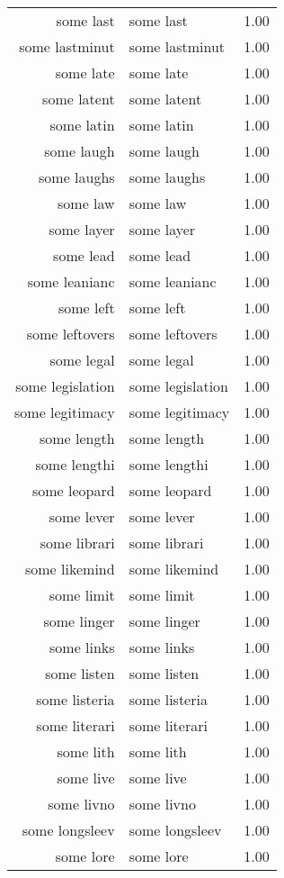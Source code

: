 \begin{table}[ht]
\begin{tabular}{rlr}
  some last & some last & 1.00 \\ 
  some lastminut & some lastminut & 1.00 \\ 
  some late & some late & 1.00 \\ 
  some latent & some latent & 1.00 \\ 
  some latin & some latin & 1.00 \\ 
  some laugh & some laugh & 1.00 \\ 
  some laughs & some laughs & 1.00 \\ 
  some law & some law & 1.00 \\ 
  some layer & some layer & 1.00 \\ 
  some lead & some lead & 1.00 \\ 
  some leanianc & some leanianc & 1.00 \\ 
  some left & some left & 1.00 \\ 
  some leftovers & some leftovers & 1.00 \\ 
  some legal & some legal & 1.00 \\ 
  some legislation & some legislation & 1.00 \\ 
  some legitimacy & some legitimacy & 1.00 \\ 
  some length & some length & 1.00 \\ 
  some lengthi & some lengthi & 1.00 \\ 
  some leopard & some leopard & 1.00 \\ 
  some lever & some lever & 1.00 \\ 
  some librari & some librari & 1.00 \\ 
  some likemind & some likemind & 1.00 \\ 
  some limit & some limit & 1.00 \\ 
  some linger & some linger & 1.00 \\ 
  some links & some links & 1.00 \\ 
  some listen & some listen & 1.00 \\ 
  some listeria & some listeria & 1.00 \\ 
  some literari & some literari & 1.00 \\ 
  some lith & some lith & 1.00 \\ 
  some live & some live & 1.00 \\ 
  some livno & some livno & 1.00 \\ 
  some longsleev & some longsleev & 1.00 \\ 
  some lore & some lore & 1.00 \\ 

\end{tabular}
\end{table}
